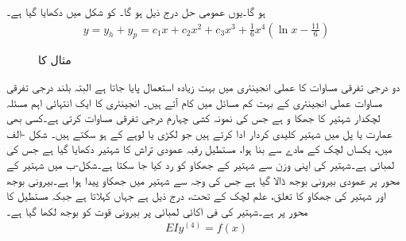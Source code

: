 ہو گا۔یوں عمومی حل درج ذیل ہو گا۔ کو شکل  میں دکھایا گیا ہے۔
\begin{align*}
y=y_h+y_p=c_1x+c_2x^2+c_3x^3+\frac{1}{6}x^4\left(\ln x-\frac{11}{6}\right)
\end{align*}
%
\begin{figure}
\centering
{}
\caption{مثال  کا }
\label{شکل_مثال_سادہ_بلند_یولر_کوشی_بدل}
\end{figure}

دو درجی تفرقی مساوات کا عملی انجینئری میں بہت زیادہ استعمال پایا جاتا ہے البتہ بلند درجی تفرقی مساوات عملی انجینئری کے بہت کم مسائل میں کام آتے ہیں۔ انجینئری کا ایک انتہائی اہم مسئلہ لچکدار شہتیر کا جھکا و ہے جس کی نمونہ کشی  چہارم درجی تفرقی مساوات کرتی ہے۔کسی بھی عمارت یا پل میں شہتیر کلیدی کردار ادا کرتے ہیں جو لکڑی یا لوہے کے ہو سکتے ہیں۔
شکل -الف میں، یکساں لچک کے مادے سے بنا ہوا، مستطیل رقبہ عمودی تراش کا شہتیر دکھایا گیا ہے جس کی لمبائی  ہے۔شہتیر کی اپنی وزن سے شہتیر کے جھکاو کو رد کیا جا سکتا ہے۔شکل-ب میں شہتیر کے  محور پر عمودی بیرونی بوجھ  ڈالا گیا ہے جس کی وجہ سے شہتیر میں جھکاو پیدا ہوا ہے۔بیرونی بوجھ اور شہتیر کی جھکاو کا تعلق، علم لچک کے تحت، درج ذیل ہے  جہاں   کہلاتا ہے جبکہ  مستطیل کا  محور پر  ہے۔شہتیر کی فی اکائی لمبائی پر بیرونی قوت کو بوجھ  لکھا گیا ہے۔ 
\begin{align}\label{مساوات_سادہ_بلند_شہتیر_کا_جھکاو_الف}
EIy^{(4)}=f(x)
\end{align}


